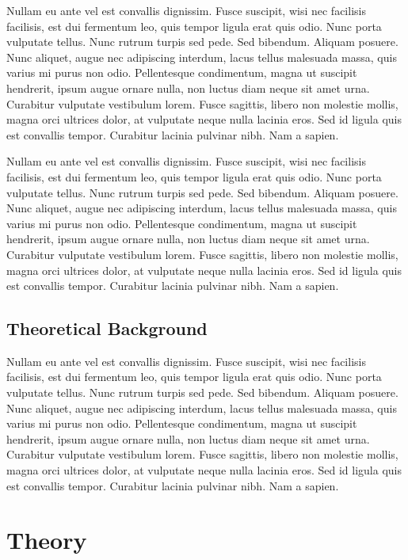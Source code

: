 \documentclass[a4paper,12pt,oneside,print,numbered,index,PageStyleIII]{PhDThesisPSnPDF}
\begin{document}
Nullam eu ante vel est convallis dignissim.  Fusce suscipit, wisi nec facilisis facilisis, est dui fermentum leo, quis tempor ligula erat quis odio.  Nunc porta vulputate tellus.  Nunc rutrum turpis sed pede.  Sed bibendum.  Aliquam posuere.  Nunc aliquet, augue nec adipiscing interdum, lacus tellus malesuada massa, quis varius mi purus non odio.  Pellentesque condimentum, magna ut suscipit hendrerit, ipsum augue ornare nulla, non luctus diam neque sit amet urna.  Curabitur vulputate vestibulum lorem.  Fusce sagittis, libero non molestie mollis, magna orci ultrices dolor, at vulputate neque nulla lacinia eros.  Sed id ligula quis est convallis tempor.  Curabitur lacinia pulvinar nibh.  Nam a sapien.

Nullam eu ante vel est convallis dignissim.  Fusce suscipit, wisi nec facilisis facilisis, est dui fermentum leo, quis tempor ligula erat quis odio.  Nunc porta vulputate tellus.  Nunc rutrum turpis sed pede.  Sed bibendum.  Aliquam posuere.  Nunc aliquet, augue nec adipiscing interdum, lacus tellus malesuada massa, quis varius mi purus non odio.  Pellentesque condimentum, magna ut suscipit hendrerit, ipsum augue ornare nulla, non luctus diam neque sit amet urna.  Curabitur vulputate vestibulum lorem.  Fusce sagittis, libero non molestie mollis, magna orci ultrices dolor, at vulputate neque nulla lacinia eros.  Sed id ligula quis est convallis tempor.  Curabitur lacinia pulvinar nibh.  Nam a sapien.

\section{Theoretical Background}
\label{sec:org793f0da}

Nullam eu ante vel est convallis dignissim.  Fusce suscipit, wisi nec facilisis facilisis, est dui fermentum leo, quis tempor ligula erat quis odio.  Nunc porta vulputate tellus.  Nunc rutrum turpis sed pede.  Sed bibendum.  Aliquam posuere.  Nunc aliquet, augue nec adipiscing interdum, lacus tellus malesuada massa, quis varius mi purus non odio.  Pellentesque condimentum, magna ut suscipit hendrerit, ipsum augue ornare nulla, non luctus diam neque sit amet urna.  Curabitur vulputate vestibulum lorem.  Fusce sagittis, libero non molestie mollis, magna orci ultrices dolor, at vulputate neque nulla lacinia eros.  Sed id ligula quis est convallis tempor.  Curabitur lacinia pulvinar nibh.  Nam a sapien.


\chapter{Theory}
\label{sec:org5093989}
\label{chapter:theory}
\end{document}
